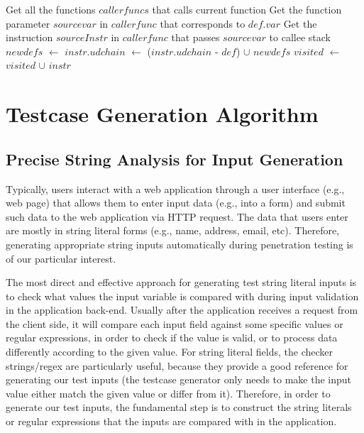 \begin{algorithm}
\begin{algorithmic}[1]
    \State{}
  \EndIf
      \State Get all the functions $callerfuncs$ that calls current function
        \State Get the function parameter $sourcevar$ in $callerfunc$ that corresponds to $def.var$
        \State Get the instruction $sourceInstr$ in $callerfunc$ that passes $sourcevar$ to callee stack
        \State $newdefs$ $\gets$ 
        \State $instr.udchain$ $\gets$ ($instr.udchain$ - $def$) $\cup$ $newdefs$
      \EndFor
    \EndIf
  \EndFor
  \State $visited$ $\gets$ $visited$ $\cup$ $instr$
  \State{}
\EndFunction
\end{algorithmic}
\end{algorithm}

\section{Testcase Generation Algorithm}

\subsection{Precise String Analysis for Input Generation} \label{stringanalysis}
Typically, users interact with a web application through a user interface (e.g., web page) that allows them to enter input data (e.g., into a form) and submit such data to the web application via HTTP request. The data that users enter are mostly in string literal forms (e.g., name, address, email, etc). Therefore, generating appropriate string inputs automatically during penetration testing is of our particular interest.

The most direct and effective approach for generating test string literal inputs is to check what values the input variable is compared with during input validation in the application back-end. Usually after the application receives a request from the client side, it will compare each input field against some specific values or regular expressions, in order to check if the value is valid, or to process data differently according to the given value. For string literal fields, the checker strings/regex are particularly useful, because they provide a good reference for generating our test inputs (the testcase generator only needs to make the input value either match the given value or differ from it). Therefore, in order to generate our test inputs, the fundamental step is to construct the string literals or regular expressions that the inputs are compared with in the application.

